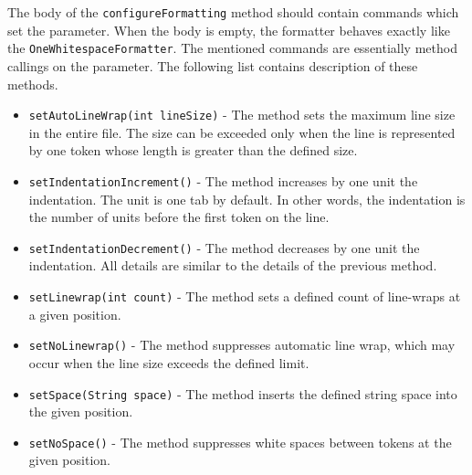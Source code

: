 \documentclass[12pt,notitlepage,a4paper]{report}
\begin{document}
The body of the \texttt{configureFormatting} method should contain commands which set the parameter. When the body is empty, the formatter behaves exactly like the \texttt{OneWhitespaceFormatter}. The mentioned commands are essentially method callings on the parameter. The following list contains description of these methods.
\begin{itemize}
\item \texttt{setAutoLineWrap(int lineSize)} - The method sets the maximum line size in the entire file. The size can be exceeded only when the line is represented by one token whose length is greater than the defined size.
\item \texttt{setIndentationIncrement()} - The method increases by one unit the indentation. The unit is one tab by default. In other words, the indentation is the number of units before the first token on the line.
\item \texttt{setIndentationDecrement()} - The method decreases by one unit the indentation. All details are similar to the details of the previous method.
\item \texttt{setLinewrap(int count)} - The method sets a defined count of line-wraps at a given position.
\item \texttt{setNoLinewrap()} - The method suppresses automatic line wrap, which may occur when the line size exceeds the defined limit.
\item \texttt{setSpace(String space)} - The method inserts the defined string space into the given position. 
\item \texttt{setNoSpace()} - The method suppresses white spaces between tokens at the given position.
\end{itemize}
\end{document}
